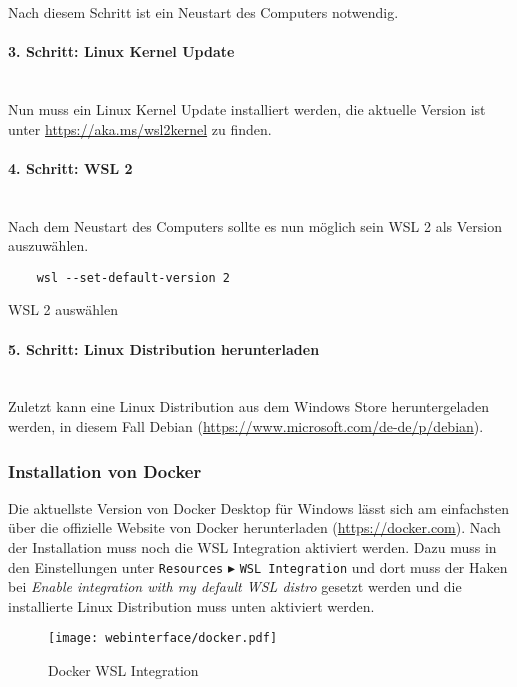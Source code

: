 Nach diesem Schritt ist ein Neustart des Computers notwendig.

\paragraph{3. Schritt: Linux Kernel Update}\mbox{}\\
Nun muss ein Linux Kernel Update installiert werden, die aktuelle Version ist
unter \url{https://aka.ms/wsl2kernel} zu finden.

\paragraph{4. Schritt: WSL 2}\mbox{}\\
Nach dem Neustart des Computers sollte es nun möglich sein WSL 2 als Version
auszuwählen.
\begin{listing}[H]
  \begin{verbatim}
    wsl --set-default-version 2
  \end{verbatim}
  \caption{WSL 2 auswählen}
\end{listing}

\paragraph{5. Schritt: Linux Distribution herunterladen}\mbox{}\\
Zuletzt kann eine Linux Distribution aus dem Windows Store heruntergeladen
werden, in diesem Fall Debian (\url{https://www.microsoft.com/de-de/p/debian}).


\subsubsection{Installation von Docker}
Die aktuellste Version von Docker Desktop für Windows lässt sich am einfachsten
über die offizielle Website von Docker herunterladen (\url{https://docker.com}).
Nach der Installation muss noch die WSL Integration aktiviert werden. Dazu muss
in den Einstellungen unter \verb|Resources| $\blacktriangleright$ \verb|WSL Integration|
und dort muss der Haken bei \textit{Enable integration with my default WSL distro}
gesetzt werden und die installierte Linux Distribution muss unten aktiviert
werden.

\begin{figure}[H]
  \centering
  \texttt{[image: webinterface/docker.pdf]}
  \caption{Docker WSL Integration}
\end{figure}


